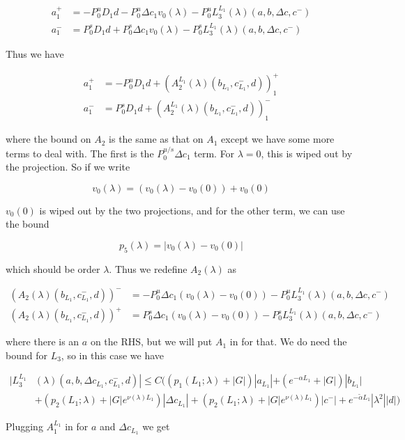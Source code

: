 \documentclass[12pt]{article}
\begin{document}
\begin{enumerate}
\begin{align*}
a_1^+ &= -P^u_0 D_1 d - P^u_0 \Delta c_1 v_0(\lambda) - P^u_0 L_3^{L_1}(\lambda)(a, b, \Delta c, c^-) \\
a_1^- &=  P^s_0 D_1 d + P^s_0 \Delta c_1 v_0(\lambda) - P^s_0 L_3^{L_1}(\lambda)(a, b, \Delta c, c^-)
\end{align*}

Thus we have

\begin{align*}
a_1^+ &= -P^u_0 D_1 d + (A_2^{L_1}(\lambda)(b_{L_1}, c_{L_1}^-, d))_1^+\\
a_1^- &=  P^s_0 D_1 d + (A_2^{L_1}(\lambda)(b_{L_1}, c_{L_1}^-, d))_1^-
\end{align*}

where the bound on $A_2$ is the same as that on $A_1$ except we have some more terms to deal with. The first is the $P^{u/s}_0 \Delta c_1$ term. For $\lambda = 0$, this is wiped out by the projection. So if we write

\[
v_0(\lambda) = (v_0(\lambda) - v_0(0)) + v_0(0)
\]

$v_0(0)$ is wiped out by the two projections, and for the other term, we can use the bound

\[
p_5(\lambda) = |v_0(\lambda) - v_0(0)| 
\]

which should be order $\lambda$. Thus we redefine $A_2(\lambda)$ as 

\begin{align*}
(A_2(\lambda)(b_{L_1}, c_{L_1}^-, d))^- &= -P^u_0 \Delta c_1 (v_0(\lambda) - v_0(0)) - P^u_0 L_3^{L_1}(\lambda)(a, b, \Delta c, c^-) \\
(A_2(\lambda)(b_{L_1}, c_{L_1}^-, d))^+ &= P^s_0 \Delta c_1 (v_0(\lambda) - v_0(0)) - P^s_0 L_3^{L_1}(\lambda)(a, b, \Delta c, c^-)
\end{align*}

where there is an $a$ on the RHS, but we will put $A_1$ in for that. We do need the bound for $L_3$, so in this case we have

\begin{align*}
|L_3^{L_1}&(\lambda)(a, b, \Delta c_{L_1}, c_{L_1}^-, d)| \leq C ( (p_1(L_1; \lambda) + |G|)|a_{L_1}| + (e^{-\alpha L_1} + |G|)|b_{L_1}| \\
&+ ( p_2(L_1; \lambda) + |G|e^{\nu(\lambda)L_1})|\Delta c_{L_1}| + ( p_2(L_1; \lambda) + |G|e^{\nu(\lambda)L_1})|c^-|+ e^{-\tilde{\alpha} L_1} |\lambda^2||d| )
\end{align*}

Plugging $A_1^{L_1}$ in for $a$ and $\Delta c_{L_1}$ we get


\end{enumerate}
\end{document}
